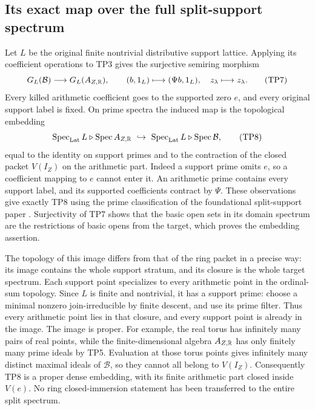\subsection{Its exact map over the full split-support spectrum}
Let $L$ be the original finite nontrivial distributive support
lattice. Applying its coefficient operations to TP3 gives the
surjective semiring morphism
\[
 G_L(\mathcal B)\longrightarrow G_L(A_{Z,\mathbb R}),\qquad
 (b,1_L)\longmapsto(\Psi b,1_L),\quad
 z_\lambda\longmapsto z_\lambda.
 \tag{TP7}\label{tp:split}
\]
Every killed arithmetic coefficient goes to the supported zero
$e$, and every original support label is fixed. On prime spectra
the induced map is the topological embedding
\[
 \operatorname{Spec}_{\rm Lat} L\triangleright\operatorname{Spec} A_{Z,\mathbb R}
 \ \hookrightarrow\
 \operatorname{Spec}_{\rm Lat} L\triangleright\operatorname{Spec}\mathcal B,
 \tag{TP8}\label{tp:spectrum}
\]
equal to the identity on support primes and to the contraction
of the closed packet $V(I_Z)$ on the arithmetic part.
Indeed a support prime omits $e$, so a coefficient mapping to
$e$ cannot enter it. An arithmetic prime contains every support
label, and its supported coefficients contract by $\Psi$.
These observations give exactly TP8 using the prime classification
of the foundational split-support paper \cite{support}.
Surjectivity of TP7 shows that the basic open sets in its domain
spectrum are the restrictions of basic opens from the target,
which proves the embedding assertion.

The topology of this image differs from that of the ring packet
in a precise way: its image contains the whole support stratum,
and its closure is the whole target spectrum. Each support point
specializes to every arithmetic point in the ordinal-sum topology.
Since $L$ is finite and nontrivial, it has a support prime: choose
a minimal nonzero join-irreducible by finite descent, and use its
prime filter. Thus every arithmetic point lies in that closure,
and every support point is already in the image.
The image is proper. For example, the real torus has infinitely
many pairs of real points, while the finite-dimensional algebra
$A_{Z,\mathbb R}$ has only finitely many prime ideals by TP5. Evaluation
at those torus points gives infinitely many distinct maximal
ideals of $\mathcal B$, so they cannot all belong to $V(I_Z)$.
Consequently TP8 is a proper dense embedding, with its finite
arithmetic part closed inside $V(e)$. No ring closed-immersion
statement has been transferred to the entire split spectrum.

